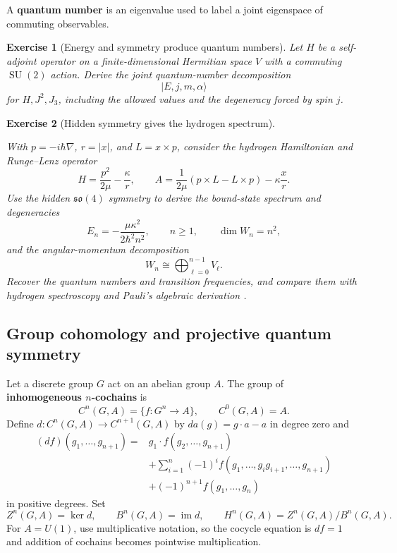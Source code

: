 \documentclass{article}
\newtheorem{exercise}{Exercise}
\begin{document}
A \textbf{quantum number} is an eigenvalue used to label a joint eigenspace
of commuting observables.

\begin{exercise}[Energy and symmetry produce quantum numbers]\leavevmode\par
\textit{Let $H$ be a self-adjoint operator on a finite-dimensional Hermitian
space $V$ with a commuting $\operatorname{SU}(2)$ action. Derive the joint
quantum-number decomposition}
\[
|E,j,m,\alpha\rangle
\]
\textit{for $H,J^2,J_3$, including the allowed values and the degeneracy
forced by spin $j$.}
\end{exercise}

\begin{exercise}[Hidden symmetry gives the hydrogen spectrum]
\label{ex:hydrogen-hidden-symmetry}\leavevmode\par
\textit{With $p=-i\hbar\nabla$, $r=|x|$, and $L=x\times p$, consider the
hydrogen Hamiltonian and Runge--Lenz operator}
\[
H=\frac{p^2}{2\mu}-\frac{\kappa}{r},
\qquad
A=\frac{1}{2\mu}(p\times L-L\times p)-\kappa\frac{x}{r}.
\]
\textit{Use the hidden $\mathfrak{so}(4)$ symmetry to derive the bound-state
spectrum and degeneracies}
\[
E_n=-\frac{\mu\kappa^2}{2\hbar^2n^2},
\qquad
n\geq1,
\qquad \dim W_n=n^2,
\]
\textit{and the angular-momentum decomposition}
\[
W_n\cong\bigoplus_{\ell=0}^{n-1}V_\ell.
\]
\textit{Recover the quantum numbers and transition frequencies, and compare
them with hydrogen spectroscopy \cite{kramida-hydrogen} and Pauli's
algebraic derivation \cite{pauli-hydrogen}.}
\end{exercise}

\subsection{Group cohomology and projective quantum symmetry}

Let a discrete group $G$ act on an abelian group $A$. The group of
\textbf{inhomogeneous $n$-cochains} is
\[
C^n(G,A)=\{f:G^n\to A\},
\qquad C^0(G,A)=A.
\]
Define $d:C^n(G,A)\to C^{n+1}(G,A)$ by $da(g)=g\cdot a-a$ in degree zero and
\[
\begin{aligned}
(df)(g_1,\ldots,g_{n+1})
={}&g_1\cdot f(g_2,\ldots,g_{n+1})\\
&+\sum_{i=1}^{n}(-1)^i
f(g_1,\ldots,g_ig_{i+1},\ldots,g_{n+1})\\
&+(-1)^{n+1}f(g_1,\ldots,g_n)
\end{aligned}
\]
in positive degrees. Set
\[
Z^n(G,A)=\ker d,\qquad
B^n(G,A)=\operatorname{im}d,\qquad
H^n(G,A)=Z^n(G,A)/B^n(G,A).
\]
For $A=U(1)$, use multiplicative notation, so the cocycle equation is
$df=1$ and addition of cochains becomes pointwise multiplication.
\end{document}

